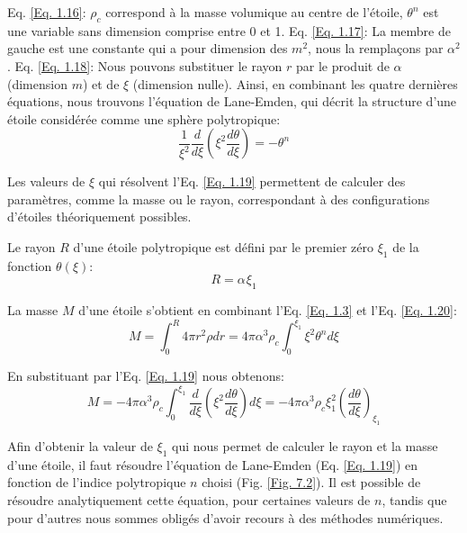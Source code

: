 Eq. \ref{Eq. 1.16}: $\rho_{c}$ correspond à la masse volumique au centre de l'étoile, $\theta^{n}$ est une variable sans dimension
comprise entre 0 et 1.\smallskip\newline
Eq. \ref{Eq. 1.17}: La membre de gauche est une constante qui a pour dimension des $m^{2}$, nous la remplaçons par $\alpha^{2}$.\smallskip\newline
Eq. \ref{Eq. 1.18}: Nous pouvons substituer le rayon $r$ par le produit de $\alpha$ (dimension $m$) et de $\xi$ (dimension nulle).\bigskip
Ainsi, en combinant les quatre dernières équations, nous trouvons l'équation de Lane-Emden\footnotemark[5], qui décrit la structure d'une étoile considérée comme une sphère polytropique:\begin{equation}\boxed{\dfrac{1}{\xi^{2}}\dfrac{d}{d\xi}\left( \xi^{2}\dfrac{d\theta}{d\xi}\right) =-\theta^{n}}\label{Eq. 1.19}\end{equation}

Les valeurs de $\xi$ qui résolvent l'Eq. \ref{Eq. 1.19} permettent de calculer des paramètres, comme la masse ou le rayon\footnotemark[6], correspondant à des configurations d'étoiles théoriquement possibles.\smallskip 

Le rayon $R$ d'une étoile polytropique est défini par le premier zéro $\xi_{1}$ de la fonction $\theta(\xi)$\footnotemark[7]:\begin{equation}R=\alpha\hspace{1pt}\xi_{1}\label{Eq. 1.20}\end{equation}

La masse $M$ d'une étoile s'obtient en combinant l'Eq. \ref{Eq. 1.3} et l'Eq. \ref{Eq. 1.20}:\begin{equation}M=\int_{0}^{R}4\pi r^{2}\rho dr=4\pi \alpha^{3} \rho_{c}\int_{0}^{\xi_{1}}\xi^{2}\theta^{n}d\xi\label{Eq. 1.21}\end{equation}

En substituant par l'Eq. \ref{Eq. 1.19} nous obtenons:\begin{equation}M=-4\pi \alpha^{3}\rho_{c}\int_{0}^{\xi_{1}}\dfrac{d}{d\xi}\left(\xi^2\dfrac{d\theta}{d\xi}\right)d\xi=-4\pi \alpha^{3}\rho_{c}\xi^{2}_{1}\left( \dfrac{d\theta}{d\xi}\right)_{\xi_{1}}\label{Eq. 1.22}\end{equation}\bigskip

Afin d'obtenir la valeur de $\xi_{1}$ qui nous permet de calculer le rayon et la masse d'une étoile, il faut résoudre l'équation de Lane-Emden (Eq. \ref{Eq. 1.19}) en fonction de l'indice polytropique $n$ choisi (Fig. \ref{Fig. 7.2}). Il est possible de résoudre analytiquement cette équation, pour certaines valeurs de $n$, tandis que pour d'autres nous sommes obligés d'avoir recours à des méthodes numériques.\smallskip 

